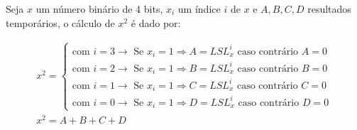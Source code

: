 \begin{infoclean}
    \centering
    Seja $x$ um número binário de 4 bits, $x_i$ um índice $i$ de $x$ e $A,B,C,D$ resultados temporários, o cálculo de $x^2$ é dado por:
\end{infoclean}
\vspace{-.5cm}
\begin{gather}
    x^2 = \begin{cases}
        \text{com $i=3 \rightarrow$ Se $x_i = 1 \Rightarrow A= LSL_{x}^i$ caso contrário $A=0$} \\
        \text{com $i=2 \rightarrow$ Se $x_i = 1 \Rightarrow B=LSL_{x}^i$ caso contrário $B=0$}  \\
        \text{com $i=1 \rightarrow$ Se $x_i = 1 \Rightarrow C=LSL_{x}^i$ caso contrário $C=0$}  \\
        \text{com $i=0 \rightarrow$ Se $x_i = 1 \Rightarrow D=LSL_{x}^i$ caso contrário $D=0$}
    \end{cases} \\
    x^2 = A + B + C + D
\end{gather}
